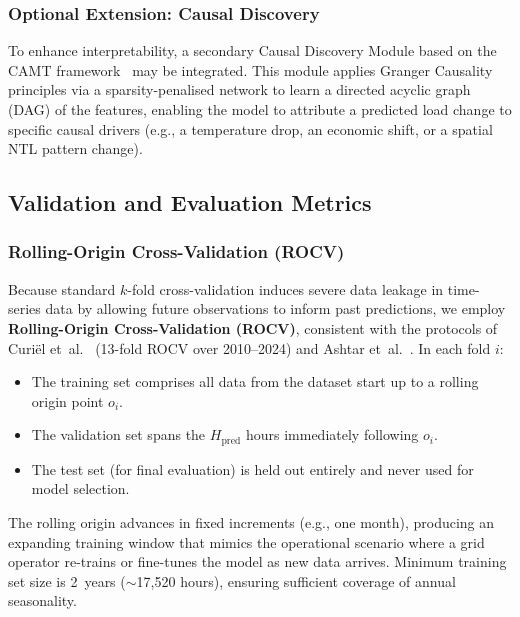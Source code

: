 \subsubsection{Optional Extension: Causal Discovery}
\label{subsubsec:causal_discovery}

To enhance interpretability, a secondary Causal Discovery Module based on the CAMT framework~\cite{wang_causal-aware_2025} may be integrated. This module applies Granger Causality principles via a sparsity-penalised network to learn a directed acyclic graph (DAG) of the features, enabling the model to attribute a predicted load change to specific causal drivers (e.g., a temperature drop, an economic shift, or a spatial NTL pattern change).


\subsection{Validation and Evaluation Metrics}
\label{subsec:validation}

\subsubsection{Rolling-Origin Cross-Validation (ROCV)}
\label{subsubsec:rocv}

Because standard $k$-fold cross-validation induces severe data leakage in time-series data by allowing future observations to inform past predictions, we employ \textbf{Rolling-Origin Cross-Validation (ROCV)}, consistent with the protocols of Curi\"el et~al.~\cite{curiel_integrating_2025} (13-fold ROCV over 2010--2024) and Ashtar et~al.~\cite{ashtar_hybrid_2025}. In each fold $i$:

\begin{itemize}
    \item The training set comprises all data from the dataset start up to a rolling origin point $o_i$.
    \item The validation set spans the $H_{\text{pred}}$ hours immediately following $o_i$.
    \item The test set (for final evaluation) is held out entirely and never used for model selection.
\end{itemize}

The rolling origin advances in fixed increments (e.g., one month), producing an expanding training window that mimics the operational scenario where a grid operator re-trains or fine-tunes the model as new data arrives. Minimum training set size is 2~years ($\sim$17{,}520 hours), ensuring sufficient coverage of annual seasonality.

